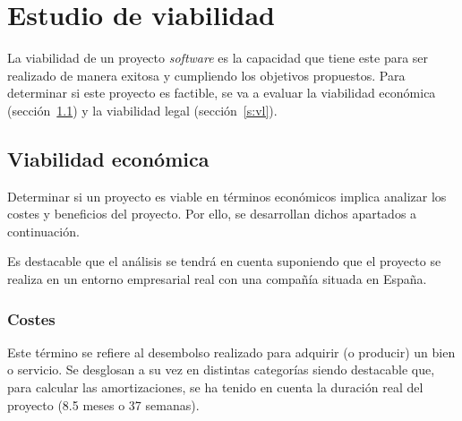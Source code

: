 \section{Estudio de viabilidad}

La viabilidad de un proyecto \textit{software} es la capacidad que tiene este para ser realizado de manera exitosa y cumpliendo los objetivos propuestos. Para determinar si este proyecto es factible, se va a evaluar la viabilidad económica (sección~\ref{s:ve}) y la viabilidad legal (sección~\ref{s:vl}).

\subsection{Viabilidad económica}
\label{s:ve}

Determinar si un proyecto es viable en términos económicos implica analizar los costes y beneficios del proyecto. Por ello, se desarrollan dichos apartados a continuación.

Es destacable que el análisis se tendrá en cuenta suponiendo que el proyecto se realiza en un entorno empresarial real con una compañía situada en España.

\subsubsection{Costes}

Este término se refiere al desembolso realizado para adquirir (o producir) un bien o servicio. Se desglosan a su vez en distintas categorías siendo destacable que, para calcular las amortizaciones, se ha tenido en cuenta la duración real del proyecto (8.5 meses o 37 semanas).

